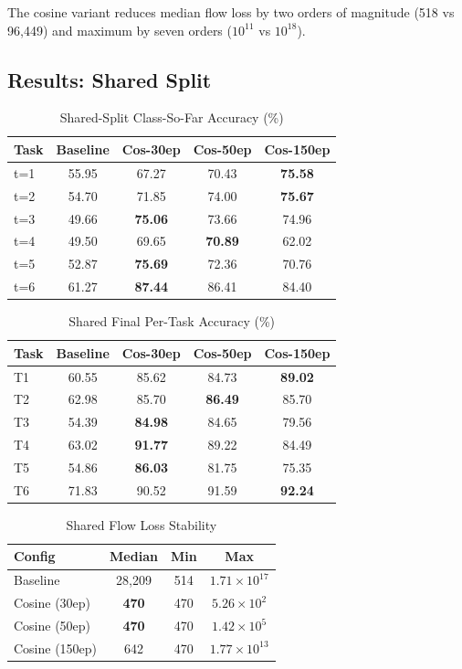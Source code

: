 \documentclass[conference]{IEEEtran}
\begin{document}
The cosine variant reduces median flow loss by two orders of magnitude (518 vs 96,449) and maximum by seven orders ($10^{11}$ vs $10^{18}$).

\subsection{Results: Shared Split}

\begin{table}[htbp]
\caption{Shared-Split Class-So-Far Accuracy (\%)}
\centering
\begin{tabular}{lcccc}
\toprule
Task & Baseline & Cos-30ep & Cos-50ep & Cos-150ep \\
\midrule
t=1 & 55.95 & 67.27 & 70.43 & \textbf{75.58} \\
t=2 & 54.70 & 71.85 & 74.00 & \textbf{75.67} \\
t=3 & 49.66 & \textbf{75.06} & 73.66 & 74.96 \\
t=4 & 49.50 & 69.65 & \textbf{70.89} & 62.02 \\
t=5 & 52.87 & \textbf{75.69} & 72.36 & 70.76 \\
t=6 & 61.27 & \textbf{87.44} & 86.41 & 84.40 \\
\bottomrule
\end{tabular}
\end{table}

\begin{table}[htbp]
\caption{Shared Final Per-Task Accuracy (\%)}
\centering
\begin{tabular}{lcccc}
\toprule
Task & Baseline & Cos-30ep & Cos-50ep & Cos-150ep \\
\midrule
T1 & 60.55 & 85.62 & 84.73 & \textbf{89.02} \\
T2 & 62.98 & 85.70 & \textbf{86.49} & 85.70 \\
T3 & 54.39 & \textbf{84.98} & 84.65 & 79.56 \\
T4 & 63.02 & \textbf{91.77} & 89.22 & 84.49 \\
T5 & 54.86 & \textbf{86.03} & 81.75 & 75.35 \\
T6 & 71.83 & 90.52 & 91.59 & \textbf{92.24} \\
\bottomrule
\end{tabular}
\end{table}

\begin{table}[htbp]
\caption{Shared Flow Loss Stability}
\centering
\begin{tabular}{lccc}
\toprule
Config & Median & Min & Max \\
\midrule
Baseline & 28,209 & 514 & $1.71\times10^{17}$ \\
Cosine (30ep) & \textbf{470} & 470 & $5.26\times10^{2}$ \\
Cosine (50ep) & \textbf{470} & 470 & $1.42\times10^{5}$ \\
Cosine (150ep) & 642 & 470 & $1.77\times10^{13}$ \\
\bottomrule
\end{tabular}
\end{table}
\end{document}
